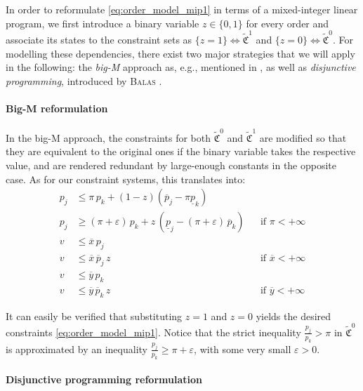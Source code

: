 \documentclass[11pt,parskip=full]{scrartcl}%
\newcommand*{\eg}{e.g., }
\begin{document}
In order to reformulate \eqref{eq:order_model_mip1} in terms of a mixed-integer linear program,
we first introduce a binary variable $ z \in \{0,1\} $ for every order and associate its states to
the constraint sets as $ \{z = 1\} \Leftrightarrow \tilde{\mathfrak{C}}^1 $ and
$ \{z = 0\} \Leftrightarrow \tilde{\mathfrak{C}}^0 $.
For modelling these dependencies, there exist two major strategies that we will apply in the
following:
the \emph{big-M} approach as, \eg mentioned in \cite{BONAMI-ET-AL_2015:indicator-constraints},
as well as \emph{disjunctive programming}, introduced by \textsc{Balas} \cite{BALAS_1979:DP}.

\paragraph{Big-M reformulation}

In the big-M approach, the constraints for both $ \tilde{\mathfrak{C}}^0 $ and
$ \tilde{\mathfrak{C}}^1 $ are modified so that they are equivalent to the original ones if the
binary variable takes the respective value, and are rendered redundant by large-enough constants in
the opposite case.
As for our constraint systems, this translates into:
\begin{subequations}
\begin{align}
  p_j &\le \pi \, p_k + (1-z) (\overline{p}_j - \pi \underline{p}_k) \\
  p_j &\ge (\pi+\varepsilon) \, p_k
    + z \, (\underline{p}_j - (\pi+\varepsilon) \, \overline{p}_k)
    && \text{if } \pi < +\infty \\[1mm]
  v &\le \overline{x} \, p_j \\
  v &\le \overline{x} \, \overline{p}_j \, z
    && \text{if } \overline{x} < +\infty  \\[1mm]
  v &\le \overline{y} \, p_k \\
  v &\le \overline{y} \, \overline{p}_k \, z
    && \text{if } \overline{y} < +\infty
\end{align}
\label{eq:order_model_mip1_bigM}
\end{subequations}

It can easily be verified that substituting $ z=1 $ and $ z=0 $ yields the desired constraints
\eqref{eq:order_model_mip1}.
Notice that the strict inequality $ \frac{p_j}{p_k} > \pi $ in $ \tilde{\mathfrak{C}}^0 $ is
approximated by an inequality $ \frac{p_j}{p_k} \ge \pi + \varepsilon $, with some very small
$ \varepsilon > 0 $.

\paragraph{Disjunctive programming reformulation}
\end{document}
